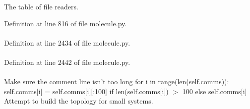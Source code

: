 \-The table of file readers. 



\-Definition at line 816 of file molecule.\-py.

\hypertarget{classforcebalance_1_1molecule_1_1Molecule_afcd4c8e1671af626d0267a243e69530d}{
\paragraph[{resid}]{}}\label{classforcebalance_1_1molecule_1_1Molecule_afcd4c8e1671af626d0267a243e69530d}


\-Definition at line 2434 of file molecule.\-py.

\hypertarget{classforcebalance_1_1molecule_1_1Molecule_a4aebc6ada9bda74a6740568d4f3658eb}{
\paragraph[{resname}]{}}\label{classforcebalance_1_1molecule_1_1Molecule_a4aebc6ada9bda74a6740568d4f3658eb}


\-Definition at line 2442 of file molecule.\-py.

\hypertarget{classforcebalance_1_1molecule_1_1Molecule_accabf9159aa7f3c6e514ec048d88eeaa}{
\paragraph[{topology}]{}}\label{classforcebalance_1_1molecule_1_1Molecule_accabf9159aa7f3c6e514ec048d88eeaa}


\-Make sure the comment line isn't too long for i in range(len(self.\-comms))\-: self.\-comms\mbox{[}i\mbox{]} = self.\-comms\mbox{[}i\mbox{]}\mbox{[}\-:100\mbox{]} if len(self.\-comms\mbox{[}i\mbox{]}) $>$ 100 else self.\-comms\mbox{[}i\mbox{]} \-Attempt to build the topology for small systems. 


